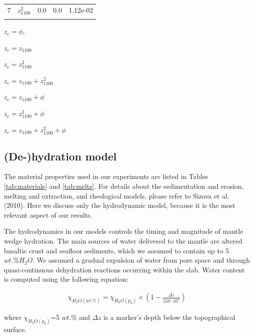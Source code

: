 \documentclass[draft,linenumbers]{agujournal2018}
\begin{document}
\begin{table}
\begin{threeparttable}
\begin{tabular}[t]{llrrl}
7 & $z_{1100}^2$ & 0.0 & 0.0 & 1.12e-02\\
\cellcolor{gray!6}{7} & \cellcolor{gray!6}{$\phi$} & \cellcolor{gray!6}{-0.1} & \cellcolor{gray!6}{0.0} & \cellcolor{gray!6}{7.28e-04}\\
\bottomrule
\end{tabular}
\begin{tablenotes}
\item[1] $z_c=\phi$,
\item[2] $z_c=z_{1100}$
\item[3] $z_c=z_{1100}^2$
\item[4] $z_c=z_{1100}+z_{1100}^2$
\item[5] $z_c=z_{1100}+\phi$
\item[6] $z_c=z_{1100}^2+\phi$
\item[7] $z_c=z_{1100}+z_{1100}^2+\phi$
\end{tablenotes}
\end{threeparttable}
\end{table}

\clearpage

\subsection{(De-)hydration model}

The material properties used in our experiments are listed in Tables
\ref{tab:materials} and \ref{tab:melts}. For details about the
sedimentation and erosion, melting and extraction, and rheological
models, please refer to Sizova et al. (2010). Here we discuss only the
hydrodynamic model, because it is the most relevant aspect of our
results.

The hydrodynamics in our models controls the timing and magnitude of
mantle wedge hydration. The main sources of water delivered to the
mantle are altered basaltic crust and seafloor sediments, which we
assumed to contain up to 5 \(wt.\% H_{2}O\). We assumed a gradual
expulsion of water from pore space and through quasi-continuous
dehydration reactions occurring within the slab. Water content is
computed using the following equation:

\[\begin{aligned}\chi_{H_{2}O(wt.\%)} = \chi_{H_{2}O(p_{0})} \times \left( 1 - \frac{\Delta z}{150 \cdot 10^{3}} \right)\end{aligned}\]

where \(\chi_{H_{2}O(p_{0})}\)=5 \(wt.\%\) and \(\Delta z\) is a
marker's depth below the topographical surface.
\end{document}
